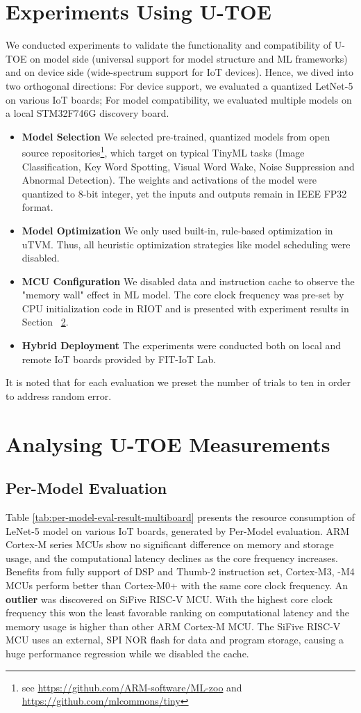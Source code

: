 \section{Experiments Using U-TOE}
We conducted experiments to validate the functionality and compatibility of U-TOE on model side (universal support for model structure and ML frameworks) and on device side (wide-spectrum support for IoT devices). Hence, we dived into two orthogonal directions: For device support, we evaluated a quantized LetNet-5 on various IoT boards; For model compatibility, we evaluated multiple models on a local STM32F746G discovery board. 
\begin{itemize}
    \item \textbf{Model Selection} We selected pre-trained, quantized models from open source repositories\footnote{see \url{https://github.com/ARM-software/ML-zoo} and \url{https://github.com/mlcommons/tiny}}, which target on typical TinyML tasks (Image Classification, Key Word Spotting, Visual Word Wake, Noise Suppression and Abnormal Detection). The weights and activations of the model were quantized to 8-bit integer, yet the inputs and outputs remain in IEEE FP32 format.
    \item \textbf{Model Optimization} We only used built-in, rule-based optimization in uTVM. Thus, all heuristic optimization strategies like model scheduling were disabled.
    \item \textbf{MCU Configuration} We disabled data and instruction cache to observe the "memory wall" effect in ML model. The core clock frequency was pre-set by CPU initialization code in RIOT and is presented with experiment results in Section ~\ref{sec:results}. 
    \item \textbf{Hybrid Deployment} The experiments were conducted both on local and remote IoT boards provided by FIT-IoT Lab. 
\end{itemize}
It is noted that for each evaluation we preset the number of trials to ten in order to address random error.

\section{Analysing U-TOE Measurements}
\label{sec:results}
\subsection{Per-Model Evaluation}
Table \ref{tab:per-model-eval-result-multiboard} presents the resource consumption of LeNet-5 model on various IoT boards, generated by Per-Model evaluation. ARM Cortex-M series MCUs show no significant difference on memory and storage usage, and the computational latency declines as the core frequency increases. Benefits from fully support of DSP and Thumb-2 instruction set, Cortex-M3, -M4 MCUs perform better than Cortex-M0+ with the same core clock frequency. An \textbf{outlier} was discovered on SiFive RISC-V MCU. With the highest core clock frequency this won the least favorable ranking on computational latency and the memory usage is higher than other ARM Cortex-M MCU. The SiFive RISC-V MCU uses an external, SPI NOR flash for data and program storage, causing a huge performance regression while we disabled the cache.

